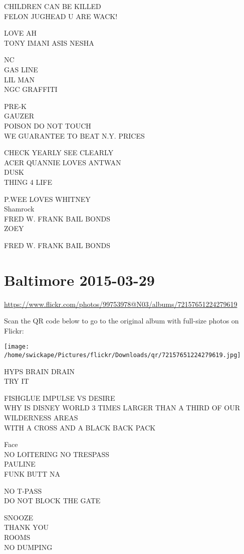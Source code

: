 \documentclass[10pt,letterpaper]{article}
\begin{document}
CHILDREN CAN BE KILLED\\
FELON JUGHEAD U ARE WACK!

LOVE AH\\
TONY IMANI ASIS NESHA

NC\\
GAS LINE\\
LIL MAN\\
NGC GRAFFITI

PRE{-}K\\
GAUZER\\
POISON DO NOT TOUCH\\
WE GUARANTEE TO BEAT N.Y. PRICES

CHECK YEARLY SEE CLEARLY\\
ACER QUANNIE LOVES ANTWAN\\
DUSK\\
THING 4 LIFE

P.WEE LOVES WHITNEY\\
Shamrock\\
FRED W. FRANK BAIL BONDS\\
ZOEY

FRED W. FRANK BAIL BONDS
\pagebreak

\section*{Baltimore 2015-03-29}

\url{https://www.flickr.com/photos/99753978@N03/albums/72157651224279619}

Scan the QR code below to go to the original album with full-size photos on Flickr:

\texttt{[image: /home/swickape/Pictures/flickr/Downloads/qr/72157651224279619.jpg]}
\pagebreak

HYPS BRAIN DRAIN\\
TRY IT

FISHGLUE IMPULSE VS DESIRE\\
WHY IS DISNEY WORLD 3 TIMES LARGER THAN A THIRD OF OUR WILDERNESS AREAS\\
WITH A CROSS AND A BLACK BACK PACK

Face\\
NO LOITERING NO TRESPASS\\
PAULINE\\
FUNK BUTT NA

NO T{-}PASS\\
DO NOT BLOCK THE GATE

SNOOZE\\
THANK YOU\\
ROOMS\\
NO DUMPING
\end{document}
